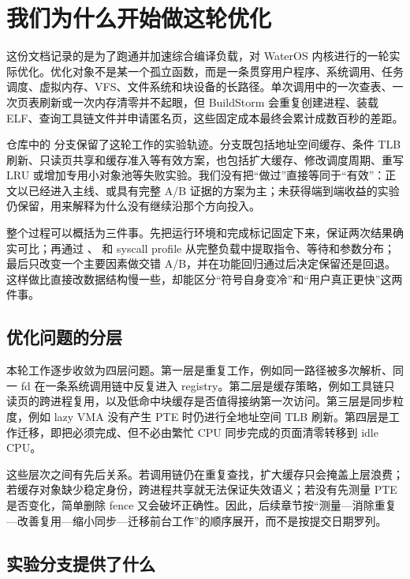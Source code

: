 \chapter{我们为什么开始做这轮优化}

这份文档记录的是为了跑通并加速综合编译负载，对 WaterOS 内核进行的一轮实际优化。优化对象不是某一个孤立函数，而是一条贯穿用户程序、系统调用、任务调度、虚拟内存、VFS、文件系统和块设备的长路径。单次调用中的一次查表、一次页表刷新或一次内存清零并不起眼，但 BuildStorm 会重复创建进程、装载 ELF、查询工具链文件并申请匿名页，这些固定成本最终会累计成数百秒的差距。

仓库中的  分支保留了这轮工作的实验轨迹。分支既包括地址空间缓存、条件 TLB 刷新、只读页共享和缓存准入等有效方案，也包括扩大缓存、修改调度周期、重写 LRU 或增加专用小对象池等失败实验。我们没有把“做过”直接等同于“有效”：正文以已经进入主线、或具有完整 A/B 证据的方案为主；未获得端到端收益的实验仍保留，用来解释为什么没有继续沿那个方向投入。

整个过程可以概括为三件事。先把运行环境和完成标记固定下来，保证两次结果确实可比；再通过 、 和 syscall profile 从完整负载中提取指令、等待和参数分布；最后只改变一个主要因素做交错 A/B，并在功能回归通过后决定保留还是回退。这样做比直接改数据结构慢一些，却能区分“符号自身变冷”和“用户真正更快”这两件事。

\section{优化问题的分层}

本轮工作逐步收敛为四层问题。第一层是重复工作，例如同一路径被多次解析、同一 fd 在一条系统调用链中反复进入 registry。第二层是缓存策略，例如工具链只读页的跨进程复用，以及低命中块缓存是否值得接纳第一次访问。第三层是同步粒度，例如 lazy VMA 没有产生 PTE 时仍进行全地址空间 TLB 刷新。第四层是工作迁移，即把必须完成、但不必由繁忙 CPU 同步完成的页面清零转移到 idle CPU。

这些层次之间有先后关系。若调用链仍在重复查找，扩大缓存只会掩盖上层浪费；若缓存对象缺少稳定身份，跨进程共享就无法保证失效语义；若没有先测量 PTE 是否变化，简单删除 fence 又会破坏正确性。因此，后续章节按“测量---消除重复---改善复用---缩小同步---迁移前台工作”的顺序展开，而不是按提交日期罗列。

\section{实验分支提供了什么}

